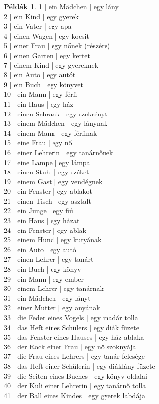 \documentclass{article}
\theoremstyle{definition}
\newtheorem*{exmp}{Példák}
\begin{document}
\begin{exmp}
1 | ein Mädchen | egy lány\\
2 | ein Kind | egy gyerek\\
3 | ein Vater | egy apa\\
4 | einen Wagen | egy kocsit\\
5 | einer Frau | egy nőnek (részére)\\
6 | einen Garten | egy kertet\\
7 | einem Kind | egy gyereknek\\
8 | ein Auto | egy autót\\
9 | ein Buch | egy könyvet\\
10 | ein Mann | egy férfi\\
11 | ein Haus | egy ház\\
12 | einen Schrank | egy szekrényt\\
13 | einem Mädchen | egy lánynak\\
14 | einem Mann | egy férfinak\\
15 | eine Frau | egy nő\\
16 | einer Lehrerin | egy tanárnőnek\\
17 | eine Lampe | egy lámpa\\
18 | einen Stuhl | egy széket\\
19 | einem Gast | egy vendégnek\\
20 | ein Fenster | egy ablakot\\
21 | einen Tisch | egy asztalt\\
22 | ein Junge | egy fiú\\
23 | ein Haus | egy házat\\
24 | ein Fenster | egy ablak\\
25 | einem Hund | egy kutyának\\
26 | ein Auto | egy autó\\
27 | einen Lehrer | egy tanárt\\
28 | ein Buch | egy könyv\\
29 | ein Mann | egy ember\\
30 | einem Lehrer | egy tanárnak\\
31 | ein Mädchen | egy lányt\\
32 | einer Mutter | egy anyának\\
33 | die Feder eines Vogels | egy madár tolla\\
34 | das Heft eines Schülers | egy diák füzete\\
35 | das Fenster eines Hauses | egy ház ablaka\\
36 | der Rock einer Frau | egy nő szoknyája\\
37 | die Frau eines Lehrers | egy tanár felesége\\
38 | das Heft einer Schülerin | egy diáklány füzete\\
39 | die Seiten eines Buches | egy könyv oldalai\\
40 | der Kuli einer Lehrerin | egy tanárnő tolla\\
41 | der Ball eines Kindes | egy gyerek labdája\\
\end{exmp}
\end{document}
